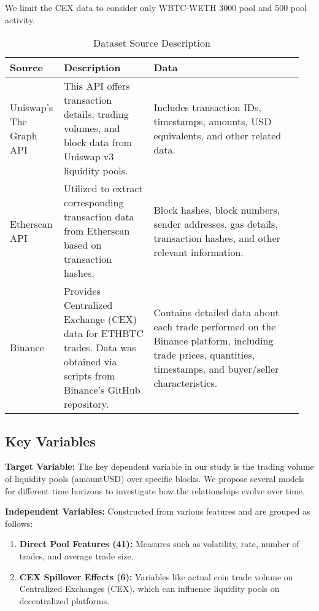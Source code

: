\documentclass{article}
\begin{document}
We limit the CEX data to consider only WBTC-WETH 3000 pool and 500 pool activity.

\begin{table}[ht]
  \centering
  \small
  \begin{tabular}{|p{0.15\linewidth}|p{0.30\linewidth}|p{0.5\linewidth}|}
  \hline
  \textbf{Source} & \textbf{Description} & \textbf{Data} \\
  \hline
  Uniswap's The Graph API\cite{uniswapAPI} & This API offers transaction details, trading volumes, and block data from Uniswap v3 liquidity pools. & Includes transaction IDs, timestamps, amounts, USD equivalents, and other related data. \\
  \hline
  Etherscan API\cite{etherscanAPI} & Utilized to extract corresponding transaction data from Etherscan based on transaction hashes. & Block hashes, block numbers, sender addresses, gas details, transaction hashes, and other relevant information. \\
  \hline
  Binance\cite{binanceData} & Provides Centralized Exchange (CEX) data for ETHBTC trades. Data was obtained via scripts from Binance's GitHub repository. & Contains detailed data about each trade performed on the Binance platform, including trade prices, quantities, timestamps, and buyer/seller characteristics. \\
  \hline
  \end{tabular}
  \caption{Dataset Source Description}
  \label{tab:dataset-description}
  \end{table}

\subsection{\textbf{Key Variables}}

\textbf{Target Variable:} The key dependent variable in our study is the trading volume of liquidity pools (amountUSD) over specific blocks. We propose several models for different time horizons to investigate how the relationships evolve over time.

\textbf{Independent Variables:} Constructed from various features and are grouped as follows:

\begin{enumerate}[label=\arabic*. ,itemsep=0pt, topsep=0pt]
\item \textbf{Direct Pool Features (41):} Measures such as volatility, rate, number of trades, and average trade size.
\item \textbf{CEX Spillover Effects (6):} Variables like actual coin trade volume on Centralized Exchanges (CEX), which can influence liquidity pools on decentralized platforms.
\end{enumerate}
\end{document}

